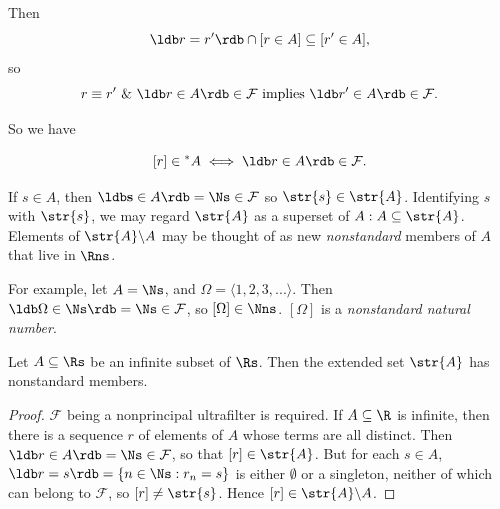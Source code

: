Then
\[
\ldb r = r' \rdb \cap [r \in A] \subseteq [r' \in A],
\]
so
\[
r \equiv r' \ \&\ \ldb r \in A\rdb \in \mathcal{F} \text{ implies } \ldb r' \in A\rdb \in \mathcal{F}.
\]

So we have

$$
[ r] \in {}^*A \iff \ldb r \in A\rdb \in \mathcal{F}.
$$

If $s \in A$, then $\ldb \mathbf{s} \in A\rdb=\Ns \in \mathcal{F}$ so $\str{s} \in \str{A}$. Identifying $s$ with $\str{s}$, we may regard $\str{A}$ as a superset of $A: A \subseteq \str{A}$. Elements of $\str{A} \backslash A$ may be thought of as new \textit{nonstandard} members of $A$ that live in $\Rns$. 

For example, let $A=\Ns$, and $\Omega=\langle 1,2,3,... \rangle$. Then $\ldb \Omega \in \Ns\rdb=\Ns \in \mathcal{F}$, so $[\Omega] \in \Nns$. $[\Omega]$ is a \textit{nonstandard natural number}.

\begin{thm}
    Let $A \subseteq \Rs$ be an infinite subset of $\Rs$. Then the extended set $\str{A}$ has nonstandard members.
\end{thm}
\begin{proof}
    $\mathcal{F}$ being a nonprincipal ultrafilter is required. If $A \subseteq \R$ is infinite, then there is a sequence $r$ of elements of $A$ whose terms are all distinct. Then $\ldb r \in A \rdb= \Ns \in \mathcal{F}$, so that $[r] \in \str{A}$. But for each $s \in A$, $\ldb r = s\rdb=\{n \in \Ns: r_n = s\}$ is either $\emptyset$ or a singleton, neither of which can belong to $\mathcal{F}$, so $[r] \neq \str{s}$. Hence $[r] \in \str{A} \backslash A$.
\end{proof}